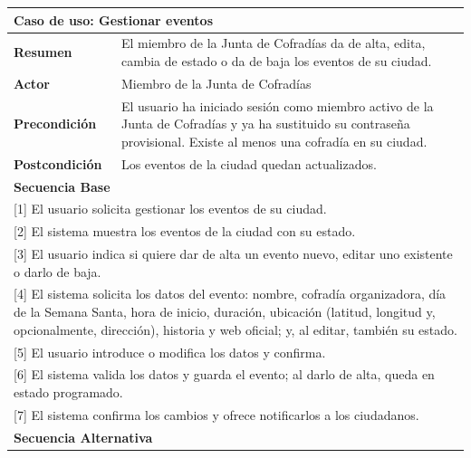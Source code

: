 \begin{table}[h!]
    \centering
    \renewcommand{\arraystretch}{1.3}

    \begin{tabular}{|p{4cm}|p{11cm}|}
        \hline
        \multicolumn{2}{|l|}{\textbf{Caso de uso: Gestionar eventos}} \\
        \hline
        \textbf{Resumen} & El miembro de la Junta de Cofradías da de alta, edita, cambia de estado o da de baja los eventos de su ciudad. \\
        \hline
        \textbf{Actor} & Miembro de la Junta de Cofradías \\
        \hline
        \textbf{Precondición} & El usuario ha iniciado sesión como miembro activo de la Junta de Cofradías y ya ha sustituido su contraseña provisional. Existe al menos una cofradía en su ciudad. \\
        \hline
        \textbf{Postcondición} & Los eventos de la ciudad quedan actualizados. \\
        \hline
        \multicolumn{2}{|l|}{\textbf{Secuencia Base}} \\
        \hline
        \multicolumn{2}{|p{15cm}|}{ [1] El usuario solicita gestionar los eventos de su ciudad. } \\
        \hline
        \multicolumn{2}{|p{15cm}|}{ [2] El sistema muestra los eventos de la ciudad con su estado. } \\
        \hline
        \multicolumn{2}{|p{15cm}|}{ [3] El usuario indica si quiere dar de alta un evento nuevo, editar uno existente o darlo de baja. } \\
        \hline
        \multicolumn{2}{|p{15cm}|}{ [4] El sistema solicita los datos del evento: nombre, cofradía organizadora, día de la Semana Santa, hora de inicio, duración, ubicación (latitud, longitud y, opcionalmente, dirección), historia y web oficial; y, al editar, también su estado. } \\
        \hline
        \multicolumn{2}{|p{15cm}|}{ [5] El usuario introduce o modifica los datos y confirma. } \\
        \hline
        \multicolumn{2}{|p{15cm}|}{ [6] El sistema valida los datos y guarda el evento; al darlo de alta, queda en estado programado. } \\
        \hline
        \multicolumn{2}{|p{15cm}|}{ [7] El sistema confirma los cambios y ofrece notificarlos a los ciudadanos. } \\
        \hline
        \multicolumn{2}{|l|}{\textbf{Secuencia Alternativa}} \\

\end{tabular}
\end{table}
